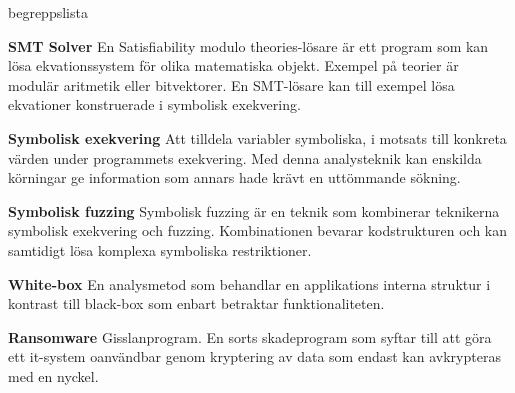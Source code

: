 \begin{labeling}{begreppslista}
    \item [\textbf{SMT Solver}] En Satisfiability modulo theories-lösare är ett
    program som kan lösa ekvationssystem för olika matematiska objekt. Exempel
    på teorier är modulär aritmetik eller bitvektorer. En SMT-lösare kan till
    exempel lösa ekvationer konstruerade i symbolisk exekvering.

    \item [\textbf{Symbolisk exekvering}] Att tilldela variabler symboliska, i
    motsats till konkreta värden under programmets exekvering. Med denna
    analysteknik kan enskilda körningar ge information som annars hade krävt
    en uttömmande sökning.

    \item [\textbf{Symbolisk fuzzing}] Symbolisk fuzzing är en teknik som
    kombinerar teknikerna symbolisk exekvering och fuzzing. Kombinationen
    bevarar kodstrukturen och kan samtidigt lösa komplexa symboliska
    restriktioner.

    \item [\textbf{White-box}] En analysmetod som behandlar en applikations
    interna struktur i kontrast till black-box som enbart betraktar
    funktionaliteten.

    \item [\textbf{Ransomware}] Gisslanprogram. En sorts skadeprogram som syftar
    till att göra ett it-system oanvändbar genom kryptering av data som
    endast kan avkrypteras med en nyckel.

\end{labeling}
